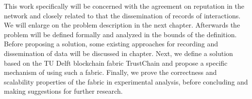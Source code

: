 This work specifically will be concerned with the agreement on reputation in the network and closely
related to that the dissemination of records of interactions. We
will enlarge on the problem description in the next chapter. Afterwards the problem will be defined
formally and analyzed in the bounds of the definition. Before proposing a solution, some existing
approaches for recording and dissemination of data will be discussed in chapter. Next, we define a
solution based on the TU Delft blockchain fabric TrustChain and propose a specific mechanism of 
using such a fabric. Finally, we prove the correctness and scalability properties of the fabric in
experimental analysis, before concluding and making suggestions for further research.